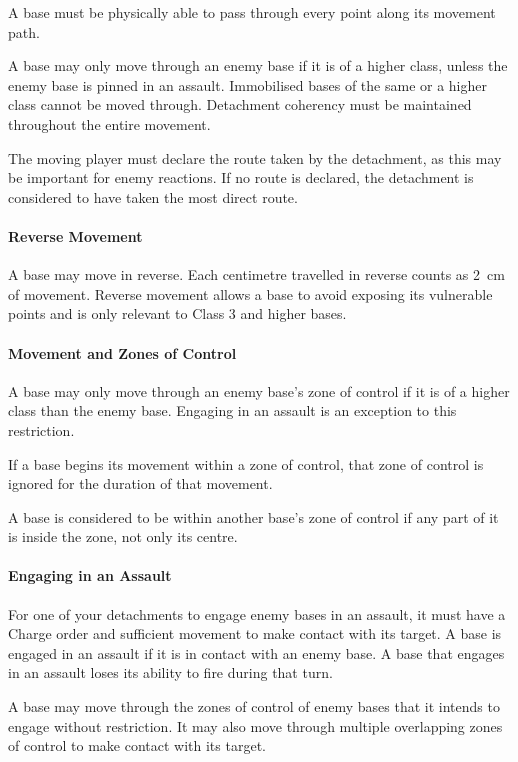 A base must be physically able to pass through every point along its movement path.

A base may only move through an enemy base if it is of a higher class, unless the enemy base is pinned in an assault. Immobilised bases of the same or a higher class cannot be moved through. Detachment coherency must be maintained throughout the entire movement.

The moving player must declare the route taken by the detachment, as this may be important for enemy reactions. If no route is declared, the detachment is considered to have taken the most direct route.

\paragraph{Reverse Movement}

A base may move in reverse. Each centimetre travelled in reverse counts as 2~cm of movement. Reverse movement allows a base to avoid exposing its vulnerable points and is only relevant to Class 3 and higher bases.

\paragraph{Movement and Zones of Control}

A base may only move through an enemy base's zone of control if it is of a higher class than the enemy base. Engaging in an assault is an exception to this restriction.

If a base begins its movement within a zone of control, that zone of control is ignored for the duration of that movement.

A base is considered to be within another base's zone of control if any part of it is inside the zone, not only its centre.

\paragraph{Engaging in an Assault}

For one of your detachments to engage enemy bases in an assault, it must have a Charge order and sufficient movement to make contact with its target. A base is engaged in an assault if it is in contact with an enemy base. A base that engages in an assault loses its ability to fire during that turn.

A base may move through the zones of control of enemy bases that it intends to engage without restriction. It may also move through multiple overlapping zones of control to make contact with its target.

